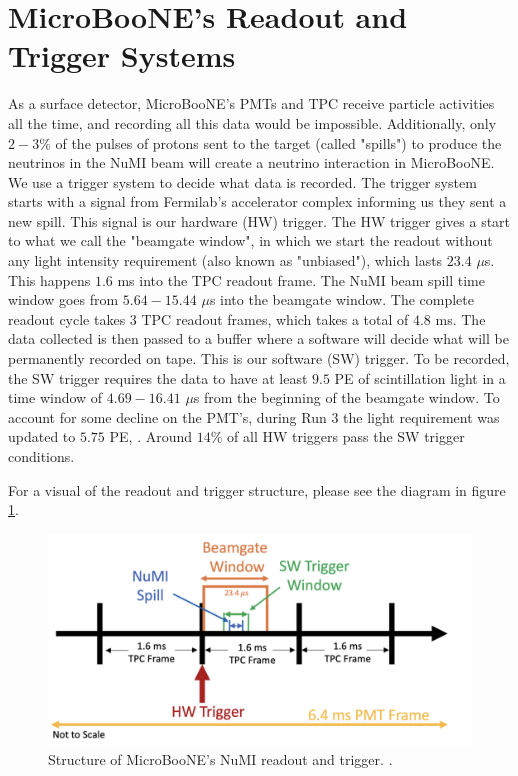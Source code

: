 \section{MicroBooNE's Readout and Trigger Systems}

As a surface detector, MicroBooNE's PMTs and TPC receive particle activities all the time, and recording all this data would be impossible. Additionally, only $2-3\%$ of the pulses of protons sent to the target (called "spills") to produce the neutrinos in the NuMI beam will create a neutrino interaction in MicroBooNE. We use a trigger system to decide what data is recorded.
The trigger system starts with a signal from Fermilab's accelerator complex informing us they sent a new spill. This signal is our hardware (HW) trigger. The HW trigger gives a start to what we call the "beamgate window", in which we start the readout without any light intensity requirement (also known as "unbiased"), which lasts $23.4$ $\mu $s. This happens $1.6$ ms into the TPC readout frame. The NuMI beam spill time window goes from $5.64- 15.44$ $\mu$s into the beamgate window. The complete readout cycle takes 3 TPC readout frames, which takes a total of $4.8$ ms.
The data collected is then passed to a buffer where a software will decide what will be permanently recorded on tape. This is our software (SW) trigger. To be recorded, the SW trigger requires the data to have at least $9.5$ PE of scintillation light in a time window of $4.69- 16.41$ $\mu$s from the beginning of the beamgate window. To account for some decline on the PMT's, during Run 3 the light requirement was updated to $5.75$ PE, \cite{numi_redmine}. 
Around $14\%$ of all HW triggers pass the SW trigger conditions. 

For a visual of the readout and trigger structure, please see the diagram in figure \ref{trig}.

\begin{figure}[h!]
    \centering
    \includegraphics[width=150mm]{Figures/numi_trigger.jpg}
    \caption{Structure of MicroBooNE's NuMI readout and trigger. \cite{krish_phd}.}
    \label{trig}
\end{figure}

